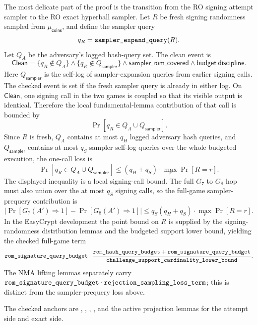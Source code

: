 The most delicate part of the proof is the transition from the RO signing
attempt sampler to the RO exact hyperball sampler.  Let \(R\) be fresh signing
randomness sampled from \(\mu_{\mathsf{coins}}\), and define the sampler query
\[
  q_R = \texttt{sampler\_expand\_query}(R).
\]
Let \(Q_A\) be the adversary's logged hash-query set.  The clean event is
\[
  \mathsf{Clean}
  =
  \{q_R\notin Q_A\}
  \wedge
  \{q_R\notin Q_{\mathsf{sampler}}\}
  \wedge
  \mathsf{sampler\_rom\_covered}
  \wedge
  \mathsf{budget\ discipline}.
\]
Here \(Q_{\mathsf{sampler}}\) is the self-log of sampler-expansion queries from
earlier signing calls.  The checked event  is set if
the fresh sampler query is already in either log.
On \(\mathsf{Clean}\), one signing call in the two games is coupled so that its
visible output is identical.  Therefore the local fundamental-lemma contribution
of that call is bounded by
\[
  \Pr[q_R\in Q_A\cup Q_{\mathsf{sampler}}].
\]
Since \(R\) is fresh, \(Q_A\) contains at most \(q_H\) logged adversary hash
queries, and \(Q_{\mathsf{sampler}}\) contains at most \(q_S\) sampler self-log
queries over the whole budgeted execution, the one-call loss is
\[
  \Pr[q_R\in Q_A\cup Q_{\mathsf{sampler}}]
  \le
  (q_H+q_S)\cdot
  \max_r \Pr[R=r].
\]
The displayed inequality is a local signing-call bound.  The full \(G_7\) to
\(G_8\) hop must also union over the at most \(q_S\) signing calls, so the
full-game sampler-prequery contribution is
\[
  \left|
  \Pr[G_7(A')\Rightarrow 1]
  -
  \Pr[G_8(A')\Rightarrow 1]
  \right|
  \le
  q_S(q_H+q_S)\cdot
  \max_r \Pr[R=r].
\]
In the EasyCrypt development the point bound on \(R\) is supplied by the
signing-randomness distribution lemmas and the budgeted support lower bound,
yielding the checked full-game term
\[
  \texttt{rom\_signature\_query\_budget}
  \cdot
  \frac{\texttt{rom\_hash\_query\_budget}+
        \texttt{rom\_signature\_query\_budget}}
       {\texttt{challenge\_support\_cardinality\_lower\_bound}}.
\]
The NMA lifting lemmas separately carry
\(\texttt{rom\_signature\_query\_budget}\cdot
\texttt{rejection\_sampling\_loss\_term}\); this is distinct from the
sampler-prequery loss above.

The checked anchors are
,
,
,
,
and the active projection lemmas for the attempt side and exact side.

